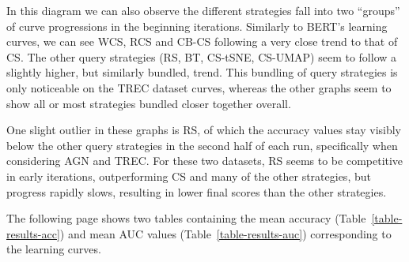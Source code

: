 \documentclass[english,bachelor,ul]{webisthesis} %
\begin{document}
In this diagram we can also observe the different strategies fall into two ``groups'' of curve progressions in the beginning iterations. Similarly to BERT's learning curves, we can see WCS, RCS and CB-CS following a very close trend to that of CS. The other query strategies (RS, BT, CS-tSNE, CS-UMAP) seem to follow a slightly higher, but similarly bundled, trend. This bundling of query strategies is only noticeable on the TREC dataset curves, whereas the other graphs seem to show all or most strategies bundled closer together overall.

One slight outlier in these graphs is RS, of which the accuracy values stay visibly below the other query strategies in the second half of each run, specifically when considering AGN and TREC. For these two datasets, RS seems to be competitive in early iterations, outperforming CS and many of the other strategies, but progress rapidly slows, resulting in lower final scores than the other strategies.


The following page shows two tables containing the mean accuracy (Table~\ref{table-results-acc}) and mean AUC values (Table~\ref{table-results-auc}) corresponding to the learning curves. 

\clearpage \newpage
\end{document}

